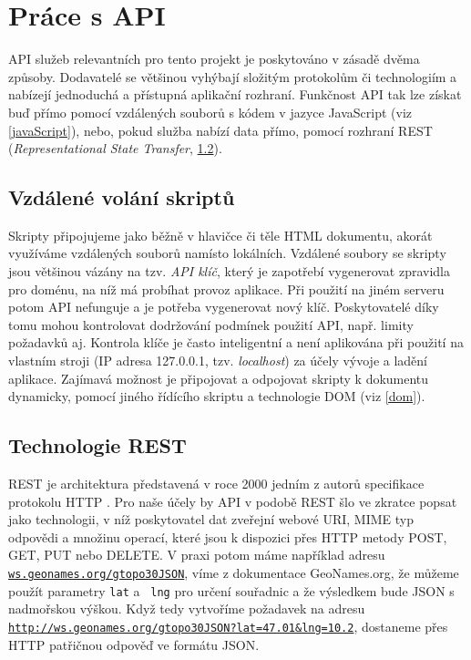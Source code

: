 \section{Práce s API}\label{api}
API služeb relevantních pro tento projekt je poskytováno v zásadě
dvěma způsoby. Dodavatelé se většinou vyhýbají složitým protokolům či
technologiím a nabízejí jednoduchá a přístupná aplikační rozhraní.
Funkčnost API tak lze získat buď přímo pomocí vzdálených souborů s
kódem v jazyce JavaScript (viz \ref{javaScript}), nebo, pokud služba
nabízí data přímo, pomocí rozhraní REST ({\it Representational State
Transfer}, \ref{rest}).

\subsection{Vzdálené volání skriptů}
Skripty připojujeme jako běžně v hlavičce či těle HTML
dokumentu, akorát využíváme vzdálených souborů namísto lokálních.
Vzdálené soubory se skripty jsou většinou vázány na tzv. {\it API
klíč}, který je zapotřebí vygenerovat zpravidla pro doménu, na níž má
probíhat provoz aplikace. Při použití na jiném serveru potom API
nefunguje a je potřeba vygenerovat nový klíč. Poskytovatelé díky tomu
mohou kontrolovat dodržování podmínek použití API, např. limity
požadavků aj. Kontrola klíče je často inteligentní a není aplikována
při použití na vlastním stroji (IP adresa 127.0.0.1, tzv. {\it
localhost}) za účely vývoje a ladění aplikace. Zajímavá možnost je
připojovat a odpojovat skripty k dokumentu dynamicky, pomocí jiného
řídícího skriptu a technologie DOM (viz \ref{dom}).

\subsection{Technologie REST}\label{rest}
REST je architektura představená v roce 2000 jedním z autorů
specifikace protokolu HTTP \cite{rest}. Pro naše účely by API v
podobě REST šlo ve zkratce popsat jako technologii, v níž poskytovatel dat zveřejní webové URI, MIME typ odpovědi a množinu operací, které jsou k dispozici přes HTTP metody POST, GET, PUT nebo DELETE. V praxi
potom máme například adresu {\tt \url{ws.geonames.org/gtopo30JSON}},
víme z dokumentace GeoNames.org, že můžeme použít parametry {\tt lat} a {\tt
lng} pro určení souřadnic a že výsledkem bude JSON s nadmořskou
výškou. Když tedy vytvoříme požadavek na adresu
{\tt \url{http://ws.geonames.org/gtopo30JSON?lat=47.01&lng=10.2}},
dostaneme přes HTTP patřičnou odpověď ve formátu JSON.

